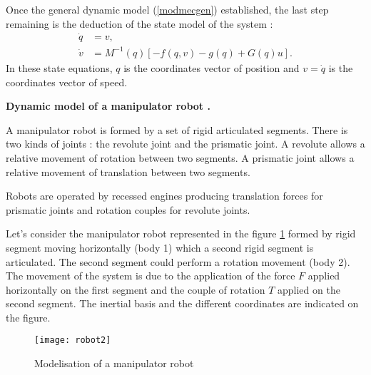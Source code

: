 \noindent Once the general dynamic model  (\ref{modmecgen}) established, the last step remaining is the deduction of the state model of the system :
\begin{equation*} \begin{split}
\dot{q} &= v, \\ 
\dot{v} &= M^{-1}(q)[-f(q,v) - g(q) + G(q)u].
\end{split} \end{equation*}
In these state equations, $q$ is the coordinates vector of position and 
$v=\dot{q}$ is the coordinates vector of speed.

\begin{exemple} {\bf Dynamic model of a manipulator robot .}

A manipulator robot is formed by a set of rigid articulated segments. There is two kinds of joints : the revolute joint and the prismatic joint. A revolute allows a relative movement of rotation between two segments. A prismatic joint allows a relative movement of translation between two segments. 

Robots are operated by recessed engines producing translation forces for prismatic joints and rotation couples for revolute joints.

Let’s consider the manipulator robot represented in the figure 
\ref{Fig:robot} formed by rigid segment 
moving horizontally (body 1) which a second rigid segment is articulated. The second segment could perform a rotation movement (body 2). The movement of the system is due to the application of the force $F$ applied horizontally on the first segment and the couple of rotation $T$ applied on the second segment. The inertial basis and the different coordinates are indicated on the figure. 


\begin{figure}[ht]
\begin{center}
\texttt{[image: robot2]}
\caption{Modelisation of a manipulator robot}
\label{Fig:robot}
\end{center}
\end{figure}


\end{exemple}

